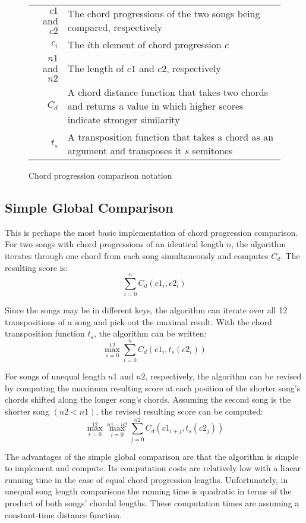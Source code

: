 \begin{figure}[h]
\centering
\begin{tabular}{rp{5.5in}}
${c1}$ and ${c2}$   & The chord progressions of the two songs being compared, respectively \\
$c_i$               & The $i$th element of chord progression $c$ \\
${n1}$ and ${n2}$   & The length of ${c1}$ and ${c2}$, respectively \\
$C_d$               & A chord distance function that takes two chords and returns a value in which higher scores indicate stronger similarity  \\
$t_s$               & A transposition function that takes a chord as an argument and transposes it $s$ semitones \\
\end{tabular}
\caption{Chord progression comparison notation}
\label{fig:comparenotation}
\end{figure}

\subsection{Simple Global Comparison} \label{simpleglobal}

This is perhaps the most basic implementation of chord progression comparison. For two songs with chord progressions of an identical length $n$, the algorithm iterates through one chord from each song simultaneously and computes $C_d$. The resulting score is: \[ \sum_{i=0}^n C_d({c1}_i, c2_i) \]

Since the songs may be in different keys, the algorithm can iterate over all 12 transpositions of a song and pick out the maximal result. With the chord transposition function $t_s$, the algorithm can be written: \[ \max_{s=0}^{12} \sum_{i=0}^n C_d({c1}_i, t_s({c2}_i)) \]

For songs of unequal length ${n1}$ and ${n2}$, respectively, the algorithm can be revised by computing the maximum resulting score at each position of the shorter song's chords shifted along the longer song's chords. Assuming the second song is the shorter song $({n2} < {n1})$, the revised resulting score can be computed: \[ \max_{s=0}^{12} \max_{i=0}^{{n1} - {n2}} \sum_{j=0}^{n2} C_d({c1}_{i+j}, t_s({c2}_j)) \]

The advantages of the simple global comparison are that the algorithm is simple to implement and compute. Its computation costs are relatively low with a linear running time in the case of equal chord progression lengths. Unfortunately, in unequal song length comparisons the running time is quadratic in terms of the product of both songs' chordal lengths. These computation times are assuming a constant-time distance function.

